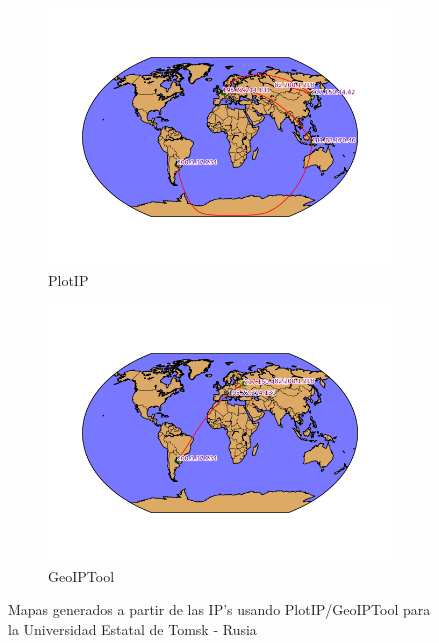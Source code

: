 \begin{figure}[ht]
	\begin{subfigure}[b]{0.5\textwidth}
		\centering
		\includegraphics[width=\linewidth]{imagenes/mapa_tsu_plotip.png}
		\caption{PlotIP}
	\end{subfigure} 
	\begin{subfigure}[b]{0.5\textwidth}
		\centering
		\includegraphics[width=\linewidth]{imagenes/mapa_tsu_geoip.png}
		\caption{GeoIPTool}
	\end{subfigure} 
	\caption{Mapas generados a partir de las IP's usando PlotIP/GeoIPTool para la Universidad Estatal de Tomsk - Rusia}
\end{figure}
